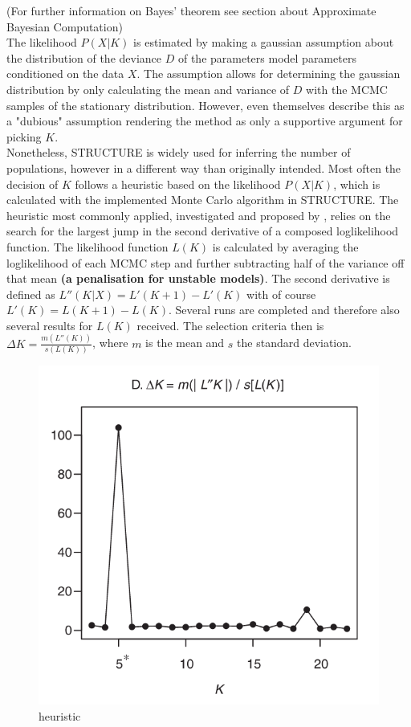 \documentclass[a4paper, 11pt]{article}
\begin{document}
(For further information on Bayes' theorem see section about Approximate Bayesian Computation)\\
The likelihood $P(X|K)$ is estimated by making a gaussian assumption about the distribution of the deviance $D$ of the parameters model parameters conditioned on the data $X$. The assumption allows for determining the gaussian distribution by only calculating the mean and variance of $D$ with the MCMC samples of the stationary distribution. However, even \textcite{pritchard2000inference} themselves describe this as a "dubious" assumption rendering the method as only a supportive argument for picking $K$.\\
Nonetheless, STRUCTURE is widely used for inferring the number of populations, however in a different way than originally intended. Most often the decision of $K$ follows a heuristic based on the likelihood $P(X|K)$, which is calculated with the implemented Monte Carlo algorithm in STRUCTURE. The heuristic most commonly applied, investigated and proposed by \cite{evanno2005detecting}, relies on the search for the largest jump in the second derivative of a composed loglikelihood function. The likelihood function $L(K)$ is calculated by averaging the loglikelihood of each MCMC step and further subtracting half of the variance off that mean \textbf{(a penalisation for unstable models)}. The second derivative is defined as $L''(K|X) = L'(K+1) - L'(K)$ with of course $L'(K) = L(K+1) - L(K)$. Several runs are completed and therefore also several results for $L(K)$ received. The selection criteria then is $\Delta K = \frac{m(L''(K))}{s(L(K))}$, where $m$ is the mean and $s$ the standard deviation. \\
\begin{figure}
\centering
\includegraphics[scale=0.4]{delta_K}
\caption{heuristic}
\end{figure}
\end{document}
